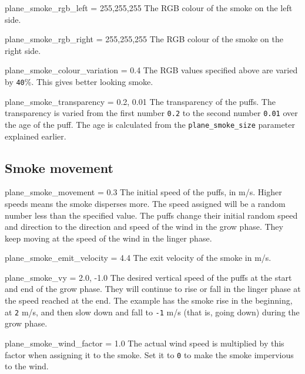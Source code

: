 \documentclass[a4paper,12pt]{article}
\newenvironment{vlist}[1]{%
\begin{list}{}{%
    \settowidth{\labelwidth}{\tt #1 }     %
    \setlength{\leftmargin}{\labelwidth}  %
    \addtolength{\leftmargin}{\labelsep}  %
    \setlength{\parsep}{0.5ex plus 0.2ex minus 0.2ex}
    \setlength{\itemsep}{0.3ex}
    \renewcommand{\makelabel}[1]{\color{headings}\tt ##1 \color{text1}\hfill}}}%
{\end{list}}
\begin{document}
\begin{vlist}{}

\item[plane\_smoke\_rgb\_left = 255,255,255] The RGB colour of the smoke
  on the left side.

\item[plane\_smoke\_rgb\_right = 255,255,255] The RGB colour of the smoke
  on the right side.

\item[plane\_smoke\_colour\_variation = 0.4] The RGB values specified
  above are varied by \texttt{40}\%. This gives better looking smoke.

\item[plane\_smoke\_transparency = 0.2, 0.01] The transparency of the
  puffs. The transparency is varied from the first number \texttt{0.2} to the
  second number \texttt{0.01} over the age of the puff. The age is
  calculated from the \texttt{plane\_smoke\_size} parameter explained earlier.

\end{vlist}{}

\vspace{0.2cm}
\subsection*{\large{\textbf{Smoke movement}}}
\vspace{0.2cm}

\begin{vlist}{}

\item[plane\_smoke\_movement = 0.3] The initial speed of the puffs, in
  m/s. Higher speeds means the smoke disperses more. The speed
  assigned will be a random number less than the specified value. The
  puffs change their initial random speed and direction to the direction and
  speed of the wind in the grow phase. They keep moving at the speed
  of the wind in the linger phase.

\item[plane\_smoke\_emit\_velocity = 4.4] The exit velocity of the smoke
  in m/s.

\item[plane\_smoke\_vy = 2.0, -1.0] The desired vertical speed of the
  puffs at the start and end of the grow phase. They will continue to
  rise or fall in the linger phase at the speed reached at the end.
  The example has the smoke rise in the beginning, at \texttt{2} m/s,
  and then slow down and fall to \texttt{-1} m/s (that is, going down)
  during the grow phase.

\item[plane\_smoke\_wind\_factor = 1.0] The actual wind speed is multiplied
  by this factor when assigning it to the smoke. Set it to \texttt{0}
  to make the smoke impervious to the wind.

\end{vlist}
\end{document}
